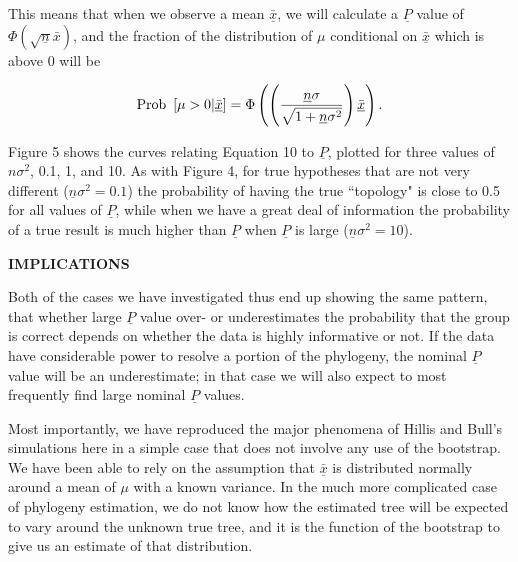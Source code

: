 {\noindent
This means that when we observe a mean $\underline{\bar x}$, we will calculate a $\underline{P}$ value
of $\Phi(\sqrt{\underline{n}}{\bar x})$, and the fraction of the distribution of $\mu$
conditional on $\underline{\bar x}$ which is above 0 will be
\bigskip
\bigskip

\begin{equation} %
{\rm Prob}~\left[\mu > 0 | \underline{\bar x}\right] =  \Phi\left(\left({\underline{n}\sigma \over
 \sqrt{1+\underline{n}\sigma^2}}\right) \underline{\bar x} \right).
\end{equation}
\bigskip
\bigskip

\noindent
Figure 5 shows the curves relating Equation 10 to $\underline{P}$, plotted for three values of
$n\sigma^2$,
0.1, 1, and 10.  As with Figure 4, for true hypotheses that are not very
different ($\underline{n}\sigma^2 = 0.1$) the probability of having the true ``topology"
is close to 0.5 for all values of $\underline{P}$, while when we have a great deal of
information the probability of a true result is much higher than $\underline{P}$ when
$\underline{P}$ is large ($\underline{n}\sigma^2 = 10$).
\bigskip

\centerline{\bf IMPLICATIONS}
\bigskip

Both of the cases we have investigated thus end up showing the same pattern,
that whether large $\underline{P}$ value
over- or underestimates the probability that the group is correct depends on
whether the data is highly informative or not.  
If the data have considerable power to resolve a portion of the
phylogeny, the nominal $\underline{P}$ value will be an underestimate; in that case we will
also expect to most frequently find large nominal $\underline{P}$ values.

Most importantly, we have reproduced the major phenomena of Hillis and Bull's
simulations here in a simple case that does not involve any use of the
bootstrap.  We have been able to rely on the assumption that $\underline{\bar x}$ is
distributed normally around a mean of $\mu$ with a known variance.  In the
much more complicated case of phylogeny estimation, we do not know how the
estimated tree will be expected to vary around the unknown true tree, and it
is the function of the bootstrap to give us an estimate of that distribution.

}
